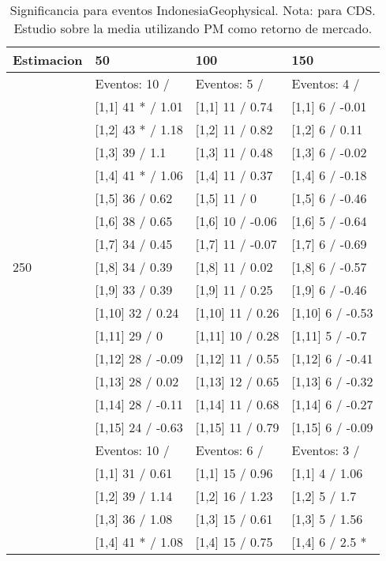 \begin{table}

\caption{Significancia para eventos IndonesiaGeophysical. Nota: para CDS. Estudio sobre la media utilizando PM como retorno de mercado.}
\centering
\begin{tabular}[t]{llll}
\toprule
Estimacion & 50 & 100 & 150\\
\midrule
 & Eventos:  10 / & Eventos:  5 / & Eventos:  4 /\\
 & {}[1,1] 41 * / 1.01 & {}[1,1] 11  / 0.74 & {}[1,1] 6  / -0.01\\
 & {}[1,2] 43 * / 1.18 & {}[1,2] 11  / 0.82 & {}[1,2] 6  / 0.11\\
 & {}[1,3] 39  / 1.1 & {}[1,3] 11  / 0.48 & {}[1,3] 6  / -0.02\\
 & {}[1,4] 41 * / 1.06 & {}[1,4] 11  / 0.37 & {}[1,4] 6  / -0.18\\
\addlinespace
 & {}[1,5] 36  / 0.62 & {}[1,5] 11  / 0 & {}[1,5] 6  / -0.46\\
 & {}[1,6] 38  / 0.65 & {}[1,6] 10  / -0.06 & {}[1,6] 5  / -0.64\\
 & {}[1,7] 34  / 0.45 & {}[1,7] 11  / -0.07 & {}[1,7] 6  / -0.69\\
250 & {}[1,8] 34  / 0.39 & {}[1,8] 11  / 0.02 & {}[1,8] 6  / -0.57\\
 & {}[1,9] 33  / 0.39 & {}[1,9] 11  / 0.25 & {}[1,9] 6  / -0.46\\
\addlinespace
 & {}[1,10] 32  / 0.24 & {}[1,10] 11  / 0.26 & {}[1,10] 6  / -0.53\\
 & {}[1,11] 29  / 0 & {}[1,11] 10  / 0.28 & {}[1,11] 5  / -0.7\\
 & {}[1,12] 28  / -0.09 & {}[1,12] 11  / 0.55 & {}[1,12] 6  / -0.41\\
 & {}[1,13] 28  / 0.02 & {}[1,13] 12  / 0.65 & {}[1,13] 6  / -0.32\\
 & {}[1,14] 28  / -0.11 & {}[1,14] 11  / 0.68 & {}[1,14] 6  / -0.27\\
\addlinespace
 & {}[1,15] 24  / -0.63 & {}[1,15] 11  / 0.79 & {}[1,15] 6  / -0.09\\
 & Eventos:  10 / & Eventos:  6 / & Eventos:  3 /\\
 & {}[1,1] 31  / 0.61 & {}[1,1] 15  / 0.96 & {}[1,1] 4  / 1.06\\
 & {}[1,2] 39  / 1.14 & {}[1,2] 16  / 1.23 & {}[1,2] 5  / 1.7\\
 & {}[1,3] 36  / 1.08 & {}[1,3] 15  / 0.61 & {}[1,3] 5  / 1.56\\
\addlinespace
 & {}[1,4] 41 * / 1.08 & {}[1,4] 15  / 0.75 & {}[1,4] 6  / 2.5 *\\

\end{tabular}
\end{table}
